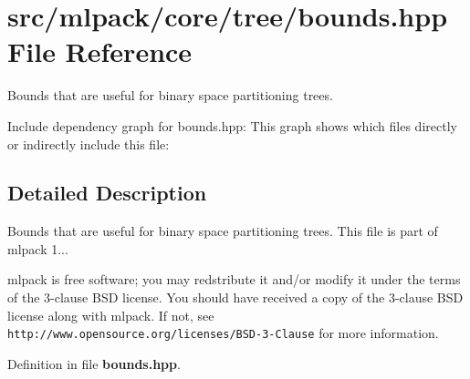 \section{src/mlpack/core/tree/bounds.hpp File Reference}
\label{bounds_8hpp}


Bounds that are useful for binary space partitioning trees.  


Include dependency graph for bounds.\-hpp\-:
This graph shows which files directly or indirectly include this file\-:


\subsection{Detailed Description}
Bounds that are useful for binary space partitioning trees. This file is part of mlpack 1...

mlpack is free software; you may redstribute it and/or modify it under the terms of the 3-\/clause B\-S\-D license. You should have received a copy of the 3-\/clause B\-S\-D license along with mlpack. If not, see {\tt http\-://www.\-opensource.\-org/licenses/\-B\-S\-D-\/3-\/\-Clause} for more information. 

Definition in file {\bf bounds.\-hpp}.

